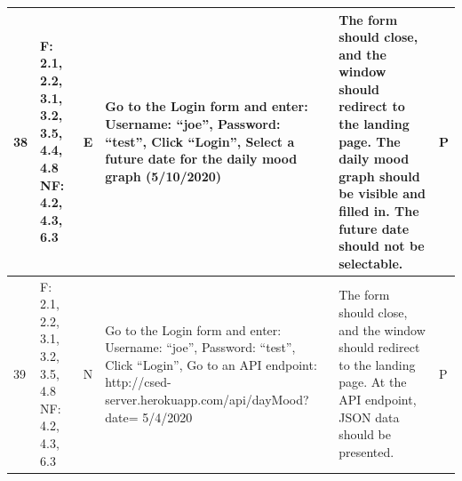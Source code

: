 \documentclass[10pt, notitlepage]{report}
\begin{document}
\begin{longtable}{| p{0.4cm} | p{1.8cm} | p{0.7cm} | p{6.5cm} | p{4.5cm} | p{0.5cm}|}
38&F: 2.1, 2.2, 3.1, 3.2, 3.5, 4.4, 4.8 NF: 4.2, 4.3, 6.3&E&Go to the Login form and enter: Username: “joe”, Password: “test”, Click “Login”, Select a future date for the daily mood graph (5/10/2020)&The form should close, and the window should redirect to the landing page. The daily mood graph should be visible and filled in. The future date should not be selectable.&P\\ \hline
39&F: 2.1, 2.2, 3.1, 3.2, 3.5, 4.8 NF: 4.2, 4.3, 6.3&N&Go to the Login form and enter: Username: “joe”, Password: “test”, Click “Login”, Go to an API endpoint: http://csed-server.herokuapp.com/api/dayMood?date= 5/4/2020&The form should close, and the window should redirect to the landing page. At the API endpoint, JSON data should be presented.&P\\ \hline

\end{longtable}
\end{document}
